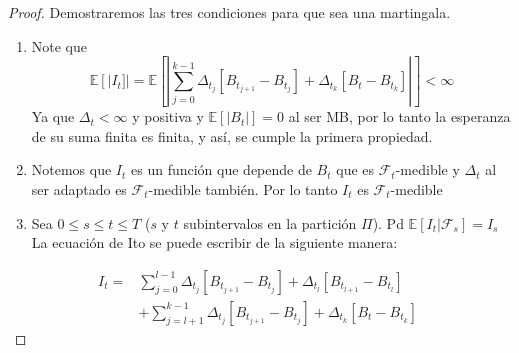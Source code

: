 \documentclass[11pt,notitlepage]{article}
\begin{document}
\begin{proof}
Demostraremos las tres condiciones para que sea una martingala. \\
\begin{enumerate}
    \item Note que \[\mathbb{E}\left[ | I_{t} ]\right |=\mathbb{E}\left [  \left | \sum_{j=0}^{k-1}\Delta_{t_j}\left [ B_{t_{j+1}}-B_{t_{j}} \right ]+\Delta_{t_k}\left [ B_t-B_{t_{k}} \right ] \right |\right ]< \infty \]
    Ya que \(\Delta_{t} < \infty\) y positiva y \(\mathbb{E}[\left | B_t \right |]  =0\) al ser MB, por lo tanto la esperanza de su suma finita es finita, y así, se cumple la primera propiedad. 
    \item Notemos que \(I_{t}\) es un función que depende de \(B_t\) que es \(\mathcal{F}_t\)-medible y \(\Delta_{t}\) al ser adaptado es \(\mathcal{F}_t\)-medible también. Por lo tanto \(I_{t}\) es \(\mathcal{F}_t\)-medible
  
    \item Sea \(0\leq s\leq t\leq T\) (\(s\) y \(t\) subintervalos en la partición \(\Pi\)).  Pd \(\mathbb{E}[I_t| \mathcal{F}_s ]=I_s\)\\
     La ecuación de Ito se puede escribir de la siguiente manera:
\end{enumerate}
\begin{align}
I_{t}=&\sum_{j=0}^{l-1}\Delta_{t_j} [ B_{t_{j+1}}-B_{t_{j}}]+\Delta_{t_l}  [ B_{t_{l+1}}-B_{t_{l}}]\label{2.2}  \\ & +\sum_{j=l+1}^{k-1}\Delta_{t_j} [ B_{t_{j+1}}-B_{t_{j}}] +\Delta_{t_k} [ B_{t}-B_{t_{k}}] \label{2.3}\; \end{align} 


\end{proof}
\end{document}

